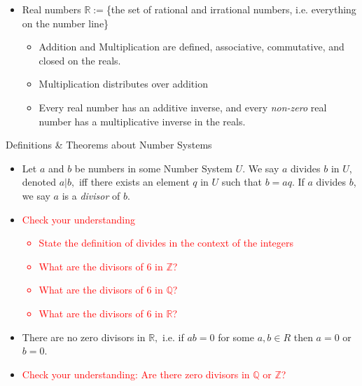 \documentclass{article}
\newcommand{\R}{\mathbb{R}}
\newcommand{\Z}{\mathbb{Z}}
\newcommand{\Q}{\mathbb{Q}}
\begin{document}
{\begin{itemize}
\begin{itemize}
			\item[] Real numbers $\R:=$\{the set of rational and irrational numbers, i.e. everything on the number line\}
			\begin{itemize}
				\item Addition and Multiplication are defined, associative, commutative, and closed on the reals.
				\item Multiplication distributes over addition
				\item Every real number has an additive inverse, and every \emph{non-zero} real number has a multiplicative inverse in the reals.
			\end{itemize}
		\end{itemize}
	\end{itemize}
	\bigskip

	Definitions \& Theorems about Number Systems
	\begin{itemize}
		\item[]  Let $a$ and $b$ be numbers in some Number System $U$. We say $a$ divides $b$ in $U$, denoted $a|b,$ iff there exists an element $q$ in $U$ such that $b=aq.$  If $a$ divides $b$, we say $a$ is a \emph{divisor} of $b.$
		\item[] \textcolor{Red}{Check your understanding \begin{itemize}
															 \item State the definition of divides in the context of the integers
															 \item What are the divisors of $6$ in $\Z$?
															 \item What are the divisors of $6$ in $\Q$?
															 \item What are the divisors of $6$ in $\R$?
		\end{itemize}}
		\item[]   There are no zero divisors in $\R,$ i.e. if $ab=0$ for some $a,b\in R$ then $a=0$ or $b=0.$
		\item[] \textcolor{Red}{Check your understanding: Are there zero divisors in $\Q$ or $\Z$?}
	\end{itemize}
	\newpage

}
\end{document}
